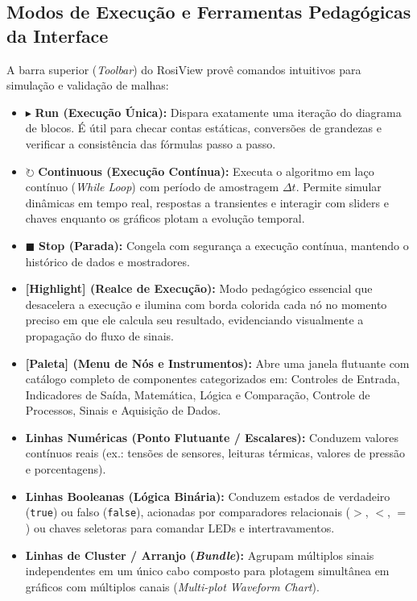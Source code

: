 \documentclass[11pt,a4paper]{article}
\begin{document}
\subsection{Modos de Execução e Ferramentas Pedagógicas da Interface}
A barra superior (\textit{Toolbar}) do RosiView provê comandos intuitivos para simulação e validação de malhas:
\begin{itemize}
    \item $\blacktriangleright$ \textbf{Run (Execução Única):} Dispara exatamente uma iteração do diagrama de blocos. É útil para checar contas estáticas, conversões de grandezas e verificar a consistência das fórmulas passo a passo.
    \item $\circlearrowright$ \textbf{Continuous (Execução Contínua):} Executa o algoritmo em laço contínuo (\textit{While Loop}) com período de amostragem $\Delta t$. Permite simular dinâmicas em tempo real, respostas a transientes e interagir com sliders e chaves enquanto os gráficos plotam a evolução temporal.
    \item $\blacksquare$ \textbf{Stop (Parada):} Congela com segurança a execução contínua, mantendo o histórico de dados e mostradores.
    \item \textbf{[Highlight] (Realce de Execução):} Modo pedagógico essencial que desacelera a execução e ilumina com borda colorida cada nó no momento preciso em que ele calcula seu resultado, evidenciando visualmente a propagação do fluxo de sinais.
    \item \textbf{[Paleta] (Menu de Nós e Instrumentos):} Abre uma janela flutuante com catálogo completo de componentes categorizados em: Controles de Entrada, Indicadores de Saída, Matemática, Lógica e Comparação, Controle de Processos, Sinais e Aquisição de Dados.
\end{itemize}

\begin{center}
\begin{minipage}{0.96\textwidth}
\begin{tcolorbox}[colback=headerBg,colframe=ifesNavy,title={\textbf{Convenção de Fios e Tipos de Dados no RosiView}},boxrule=0.7pt]
\small
\begin{itemize}
    \item \textbf{Linhas Numéricas (Ponto Flutuante / Escalares):} Conduzem valores contínuos reais (ex.: tensões de sensores, leituras térmicas, valores de pressão e porcentagens).
    \item \textbf{Linhas Booleanas (Lógica Binária):} Conduzem estados de verdadeiro (\texttt{true}) ou falso (\texttt{false}), acionadas por comparadores relacionais ($>$, $<$, $=$) ou chaves seletoras para comandar LEDs e intertravamentos.
    \item \textbf{Linhas de Cluster / Arranjo (\textit{Bundle}):} Agrupam múltiplos sinais independentes em um único cabo composto para plotagem simultânea em gráficos com múltiplos canais (\textit{Multi-plot Waveform Chart}).
\end{itemize}
\end{tcolorbox}
\end{minipage}
\end{center}
\end{document}
